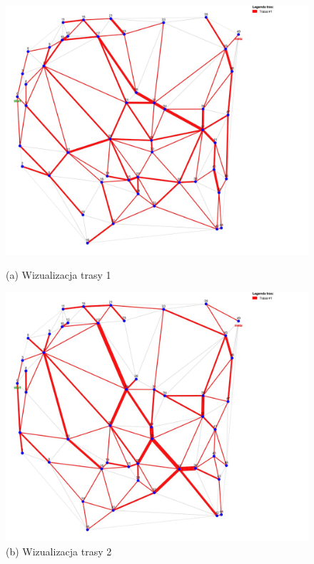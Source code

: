 \documentclass{article}
\begin{document}
\begin{figure}[H]
    \centering
    \begin{minipage}[b]{0.48\linewidth}
        \includegraphics[width=\linewidth]{1.png}
        \caption*{(a) Wizualizacja trasy 1}
    \end{minipage}
    \hfill
    \begin{minipage}[b]{0.48\linewidth}
        \includegraphics[width=\linewidth]{2.png}
        \caption*{(b) Wizualizacja trasy 2}
    \end{minipage}
    \vspace{0.5em}


\end{figure}
\end{document}

